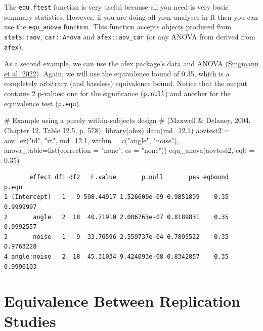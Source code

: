 \documentclass[
]{interact}
\newenvironment{Shaded}{\begin{snugshade}}{\end{snugshade}}
\newcommand{\AttributeTok}[1]{\textcolor[rgb]{0.40,0.45,0.13}{#1}}
\newcommand{\CommentTok}[1]{\textcolor[rgb]{0.37,0.37,0.37}{#1}}
\newcommand{\FloatTok}[1]{\textcolor[rgb]{0.68,0.00,0.00}{#1}}
\newcommand{\FunctionTok}[1]{\textcolor[rgb]{0.28,0.35,0.67}{#1}}
\newcommand{\NormalTok}[1]{\textcolor[rgb]{0.00,0.23,0.31}{#1}}
\newcommand{\OtherTok}[1]{\textcolor[rgb]{0.00,0.23,0.31}{#1}}
\newcommand{\StringTok}[1]{\textcolor[rgb]{0.13,0.47,0.30}{#1}}
\begin{document}
\newpage

The \texttt{equ\_ftest} function is very useful because all you need is
very basic summary statistics. However, if you are doing all your
analyses in R then you can use the \texttt{equ\_anova} function. This
function accepts objects produced from \texttt{stats::aov},
\texttt{car::Anova} and \texttt{afex::aov\_car} (or any ANOVA from
derived from \texttt{afex}).

As a second example, we can use the afex package's data and ANOVA
(\protect\hyperlink{ref-afex}{Singmann et al. 2022}). Again, we will use
the equivalence bound of 0.35, which is a completely arbitrary (and
baseless) equivalence bound. Notice that the output contains 2 p-values:
one for the significance (\texttt{p.null}) and another for the
equivalence test (\texttt{p.equ}).

\begin{Shaded}
\begin{Highlighting}[]
\CommentTok{\# Example using a purely within{-}subjects design }
\CommentTok{\# (Maxwell \& Delaney, 2004, Chapter 12, Table 12.5, p. 578):}
\FunctionTok{library}\NormalTok{(afex)}
\FunctionTok{data}\NormalTok{(md\_12}\FloatTok{.1}\NormalTok{)}
\NormalTok{aovtest2 }\OtherTok{=} \FunctionTok{aov\_ez}\NormalTok{(}\StringTok{"id"}\NormalTok{, }\StringTok{"rt"}\NormalTok{, md\_12}\FloatTok{.1}\NormalTok{, }\AttributeTok{within =} \FunctionTok{c}\NormalTok{(}\StringTok{"angle"}\NormalTok{, }\StringTok{"noise"}\NormalTok{), }
       \AttributeTok{anova\_table=}\FunctionTok{list}\NormalTok{(}\AttributeTok{correction =} \StringTok{"none"}\NormalTok{, }\AttributeTok{es =} \StringTok{"none"}\NormalTok{))}
\FunctionTok{equ\_anova}\NormalTok{(aovtest2,}
          \AttributeTok{eqb =} \FloatTok{0.35}\NormalTok{)}
\end{Highlighting}
\end{Shaded}

\begin{verbatim}
       effect df1 df2   F.value       p.null       pes eqbound     p.equ
1 (Intercept)   1   9 598.44917 1.526600e-09 0.9851839    0.35 0.9999997
2       angle   2  18  40.71910 2.086763e-07 0.8189831    0.35 0.9992557
3       noise   1   9  33.76596 2.559737e-04 0.7895522    0.35 0.9763228
4 angle:noise   2  18  45.31034 9.424093e-08 0.8342857    0.35 0.9996103
\end{verbatim}

\newpage

\hypertarget{equivalence-between-replication-studies}{%
\section{Equivalence Between Replication
Studies}\label{equivalence-between-replication-studies}}
\end{document}
